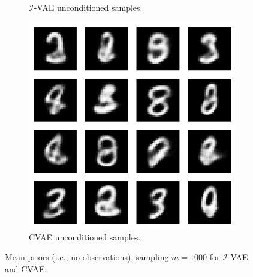 \begin{figure}[t!]
\begin{subfigure}[t]{0.32\linewidth}
        \caption{$\mathcal{I}$-VAE unconditioned samples.}
        \label{fig:mnist_ivae_samples}
    \end{subfigure}
    \hfill
    \begin{subfigure}[t]{0.32\linewidth}
        \centering
        \includegraphics[width=0.9\linewidth]{figures/ivae/mnist/mnist-cvae-samples.png}
        \caption{CVAE unconditioned samples.}
        \label{fig:mnist_cvae_samples}
    \end{subfigure}
    \caption{Mean priors (i.e., no observations), sampling $m=1000$ for $\mathcal{I}$-VAE and CVAE.}
    \label{fig:mnist_unconditioned_priors}
\end{figure}



